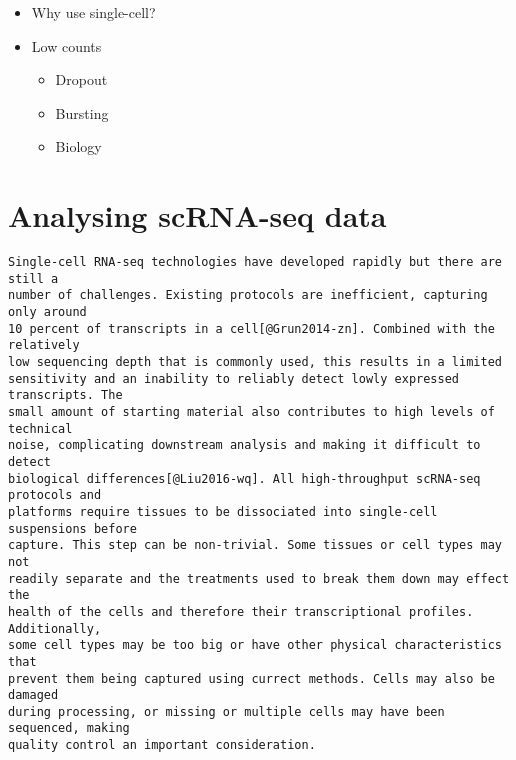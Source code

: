 \documentclass[11pt,a4paper,titlepage,twoside,openright]{style/unimelbthesis}
\theoremstyle{definition}
\theoremstyle{definition}
\theoremstyle{definition}
\theoremstyle{remark}
\begin{document}
\begin{mainmatter}
\begin{itemize}
\tightlist
\item
  Why use single-cell?
\item
  Low counts

  \begin{itemize}
  \tightlist
  \item
    Dropout
  \item
    Bursting
  \item
    Biology
  \end{itemize}
\end{itemize}

\hypertarget{analysing-scrna-seq-data}{%
\section{Analysing scRNA-seq data}\label{analysing-scrna-seq-data}}

\begin{verbatim}
Single-cell RNA-seq technologies have developed rapidly but there are still a
number of challenges. Existing protocols are inefficient, capturing only around
10 percent of transcripts in a cell[@Grun2014-zn]. Combined with the relatively
low sequencing depth that is commonly used, this results in a limited
sensitivity and an inability to reliably detect lowly expressed transcripts. The
small amount of starting material also contributes to high levels of technical
noise, complicating downstream analysis and making it difficult to detect
biological differences[@Liu2016-wq]. All high-throughput scRNA-seq protocols and
platforms require tissues to be dissociated into single-cell suspensions before
capture. This step can be non-trivial. Some tissues or cell types may not
readily separate and the treatments used to break them down may effect the
health of the cells and therefore their transcriptional profiles. Additionally,
some cell types may be too big or have other physical characteristics that
prevent them being captured using currect methods. Cells may also be damaged
during processing, or missing or multiple cells may have been sequenced, making
quality control an important consideration.


\end{verbatim}
\end{mainmatter}
\end{document}
